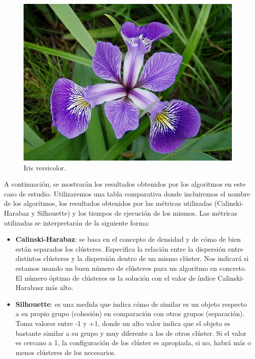 \documentclass[a4paper, 20pt]{article}
\begin{document}
\begin{figure}[h]
  \begin{minipage}[h]{0.31\textwidth}
    \includegraphics[width=\textwidth]{dani/versicolor.jpg}
    \caption{Iris versicolor.}
  \end{minipage}
\end{figure}

\clearpage

A continuación, se mostrarán los resultados obtenidos por los algoritmos en este caso de estudio. Utilizaremos una tabla comparativa donde incluiremos el nombre de los algoritmos, los resultados obtenidos por las métricas utilizadas (Calinski-Harabaz y Silhouette) y los tiempos de ejecución de los mismos. Las métricas utilizadas se interpretarán de la siguiente forma:

\begin{itemize}
\item \textbf{Calinski-Harabaz}: se basa en el concepto de densidad y de cómo de bien están separados los clústeres. Especifica la relación entre la dispersión entre distintos clústeres y la dispersión dentro de un mismo clúster. Nos indicará si estamos usando un buen número de clústeres para un algoritmo en concreto. El número óptimo de clústeres es la solución con el valor de índice Calinski-Harabasz más alto.
\item \textbf{Silhouette}: es una medida que indica cómo de similar es un objeto respecto a su propio grupo (cohesión) en comparación con otros grupos (separación). Toma valores entre -1 y +1, donde un alto valor indica que el objeto es bastante similar a su grupo y muy diferente a los de otros clúster. Si el valor es cercano a 1, la configuración de los clúster es apropiada, si no, habrá más o menos clústeres de los necesarios.
\end{itemize}
\end{document}
